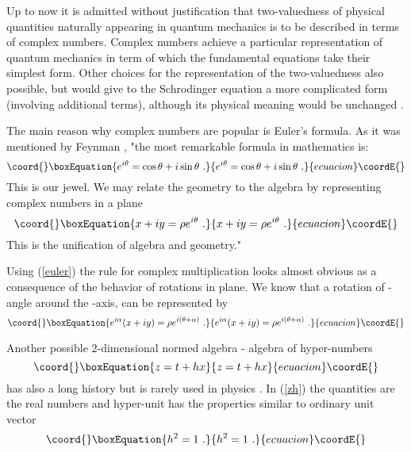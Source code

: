 \documentclass[a4paper,12pt]{article}
\begin{document}
Up to now it is admitted without justification that two-valuedness of physical quantities 
naturally appearing in quantum mechanics is to be described in terms of complex numbers. 
Complex numbers achieve a particular representation of quantum mechanics in term of which the 
fundamental equations take their simplest form. Other choices for the representation of the 
two-valuedness also possible, but would give to the Schrodinger equation a more complicated 
form (involving additional terms), although its physical meaning would be unchanged \cite{CeNo}. 

The main reason why complex numbers are popular is Euler's formula. As it was mentioned by 
Feynman \cite{Fe}, "the most remarkable formula in mathematics is:
\begin{equation}\coord{}\boxEquation{ 
e^{i\theta} = \cos{\theta} + i\sin{\theta} ~. \nonumber
}{ 
e^{i\theta} = \cos{\theta} + i\sin{\theta} ~. \nonumber
}{ecuacion}\coordE{}\end{equation}
This is our jewel. We may relate the geometry to the algebra by representing 
complex numbers in a plane
\begin{equation}\coord{}\boxEquation{ \label{euler}
x + iy = \rho e^{i\theta} ~. 
}{ x + iy = \rho e^{i\theta} ~. 
}{ecuacion}\coordE{}\end{equation}
This is the unification of algebra and geometry."

Using (\ref{euler}) the rule for complex multiplication looks almost obvious as a 
consequence of the behavior of rotations in plane. We know that a rotation of \myHighlight{$\alpha$}\coordHE{}-angle 
around the \coordHE{}-axis, can be represented 
by 
\begin{equation}\coord{}\boxEquation{ 
e^{i\alpha}(x + iy) = \rho e^{i(\theta + \alpha )} ~. \nonumber
}{ 
e^{i\alpha}(x + iy) = \rho e^{i(\theta + \alpha )} ~. \nonumber
}{ecuacion}\coordE{}\end{equation} 

Another possible 2-dimensional normed algebra - algebra of hyper-numbers 
\begin{equation}\coord{}\boxEquation{ \label{zh}
z = t + hx 
}{ z = t + hx 
}{ecuacion}\coordE{}\end{equation} 
has also a long history but is rarely used in physics \cite{OlAnFj}. In (\ref{zh}) the 
quantities \coordHE{} are the real numbers and hyper-unit \coordHE{} has the properties similar to 
ordinary unit vector 
\begin{equation}\coord{}\boxEquation{ \label{h2}
h^2 = 1~. 
}{ h^2 = 1~. 
}{ecuacion}\coordE{}\end{equation} 
\end{document}
